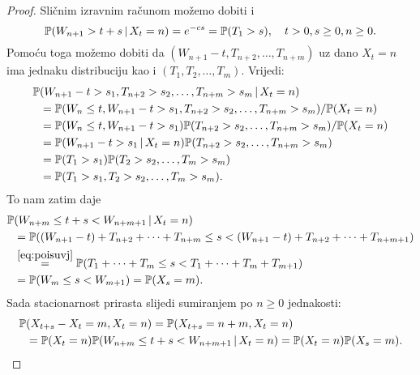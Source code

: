 \documentclass[main.tex]{subfiles}
\begin{document}
\begin{proof}
	Sličnim izravnim računom možemo dobiti i
	\begin{equation} \label{eq:poiswnuzxt}
		\mathbb{P}(W_{n+1} > t + s \, \vert \, X_t = n) = e^{-cs} = \mathbb{P}(T_1 > s), \quad t > 0, s \ge 0, n \ge 0.
	\end{equation}
	Pomoću toga možemo dobiti da \( (W_{n+1} - t, T_{n+2}, \ldots, T_{n+m}) \) uz dano \( X_t = n \)
	ima jednaku distribuciju kao i \( (T_1, T_2, \ldots, T_m) \). Vrijedi:
	\begin{align}
		\mathbb{P} & (W_{n+1} -t > s_1 , T_{n+2} > s_2, \ldots, T_{n+m} > s_m \, \vert \, X_t = n)         \\
		   & =\mathbb{P}(W_n \le t, W_{n+1} -t > s_1, T_{n+2} > s_2, \ldots, T_{n+m} > s_m)/\mathbb{P}(X_t=n) \\
		   & =\mathbb{P}(W_n \le t, W_{n+1} -t > s_1)\mathbb{P}(T_{n+2}>s_2,\ldots,T_{n+m}>s_m)/\mathbb{P}(X_t=n)     \\
		   & =\mathbb{P}(W_{n+1} -t>s_1 \, \vert \, X_t = n)\mathbb{P}(T_{n+2}>s_2,\ldots,T_{n+m}>s_m)             \\
		   & =\mathbb{P}(T_1>s_1)\mathbb{P}(T_2>s_2,\ldots,T_m>s_m)                                           \\
		   & =\mathbb{P}(T_1>s_1,T_2>s_2,\ldots,T_m>s_m). \label{eq:poisuvj}
	\end{align}
	To nam zatim daje
	\begin{equation}
		\begin{aligned} \label{eq:poislema}
			\mathbb{P} & (W_{n+m} \le t+s < W_{n+m+1} \, \vert \, X_t = n)                                                   \\
			   & =\mathbb{P}((W_{n+1}-t)+T_{n+2} + \cdots + T_{n+m} \le s < (W_{n+1}-t) + T_{n+2} + \cdots + T_{n+m+1}) \\
			   & \stackrel{\scriptstyle {\eqref{eq:poisuvj}}}{=} \mathbb{P}(T_1+\cdots+T_m \le s < T_1+\cdots+T_m+T_{m+1})
			\\&= \mathbb{P}(W_m \le s < W_{m+1}) = \mathbb{P}(X_s=m).
		\end{aligned}
	\end{equation}
	Sada stacionarnost prirasta slijedi sumiranjem po \( n \ge 0 \) jednakosti:
	\begin{equation}
		\begin{aligned}
			\mathbb{P} & (X_{t+s}-X_t =  m, X_t=n) = \mathbb{P}(X_{t+s}=n+m, X_t=n)                              \\
			   & = \mathbb{P}(X_t=n)\mathbb{P}(W_{n+m} \le t+s < W_{n+m+1} \, \vert \, X_t = n) = \mathbb{P}(X_t=n)\mathbb{P}(X_s=m).
		\end{aligned}
	\end{equation}


\end{proof}
\end{document}
